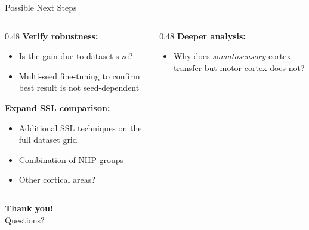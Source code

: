 \documentclass[aspectratio=169]{beamer}
\begin{document}
\begin{frame}{Possible Next Steps}
  \begin{columns}
    \begin{column}{0.48\textwidth}
      \textbf{Verify robustness:}
      \begin{itemize}
        \item Is the gain due to dataset size?
        \item Multi-seed fine-tuning to confirm best result is not seed-dependent
      \end{itemize}
      \vspace{0.5em}
      \textbf{Expand SSL comparison:}
      \begin{itemize}
        \item Additional SSL techniques on the full dataset grid
        \item Combination of NHP groups
        \item Other cortical areas?
      \end{itemize}
    \end{column}
    \begin{column}{0.48\textwidth}
      \textbf{Deeper analysis:}
      \begin{itemize}
        \item Why does \textit{somatosensory} cortex transfer but motor cortex does not?
      \end{itemize}
    \end{column}
  \end{columns}
\end{frame}

\begin{frame}
  \centering
  \Large\textbf{Thank you!}\\[1em]
  \normalsize Questions?
\end{frame}
\end{document}
